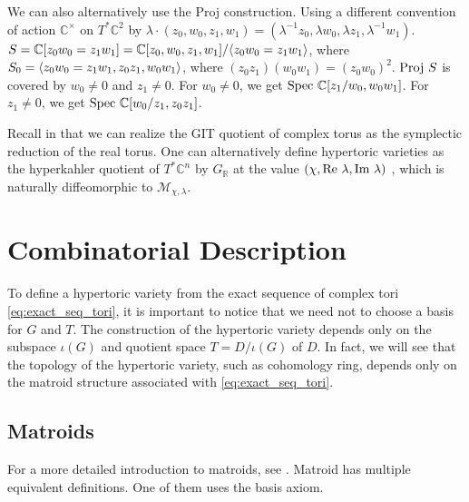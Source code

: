 \documentclass[b5paper]{article}
\newcommand{\MM}{\mathcal{M}}
\newcommand{\Proj}{\textnormal{Proj }}
\newcommand{\Spec}{\textnormal{Spec }}
\begin{document}
\begin{example}[exp:]{}
  We can also alternatively use the Proj construction. Using a different convention of action $\mathbb{C}^\times $ on $T^*\mathbb{C}^2$ by $\lambda\cdot (z_0,w_0,z_1,w_1)=(\lambda^{-1}z_0,\lambda w_0,\lambda z_1,\lambda^{-1}w_1)$. $S=\mathbb{C}[z_0w_0=z_1w_1]=\mathbb{C}[z_0,w_0,z_1,w_1]/\langle z_0w_0=z_1w_1\rangle$, where $S_0=\langle z_0w_0=z_1w_1, z_0z_1,w_0w_1\rangle$, where $(z_0z_1)(w_0w_1)=(z_0w_0)^2$. $\Proj S$ is covered by $w_0\neq 0$ and $z_1\neq 0$. For $w_0\neq 0$, we get $\Spec \mathbb{C}[z_1/w_0,w_0w_1]$. For $z_1\neq 0$, we get $\Spec\mathbb{C}[w_0/z_1,z_0z_1]$.
\end{example}


Recall in  that we can realize the GIT quotient of complex torus as the symplectic reduction of the real torus. One can alternatively define hypertoric varieties as the hyperkahler quotient of $T^*\mathbb{C}^n$ by $G_\mathbb{R}$ at the value $(\chi,\textnormal{Re }\lambda,\textnormal{Im }\lambda)$ \cite{hitchin1987hyperkahler}, which is naturally diffeomorphic to $\MM_{\chi,\lambda}$.

\section{Combinatorial Description}

To define a hypertoric variety from the exact sequence of complex tori \ref{eq:exact_seq_tori}, it is important to notice that we need not to choose a basis for $G$ and $T$. The construction of the hypertoric variety depends only on the subspace $\iota(G)$ and quotient space $T=D/\iota(G)$ of $D$.
In fact, we will see that the topology of the hypertoric variety, such as cohomology ring, depends only on the matroid structure associated with \ref{eq:exact_seq_tori}. 

\subsection{Matroids}

For a more detailed introduction to matroids, see \cite{oxley2006matroid}.
Matroid has multiple equivalent definitions. One of them uses the basis axiom. 
\end{document}
